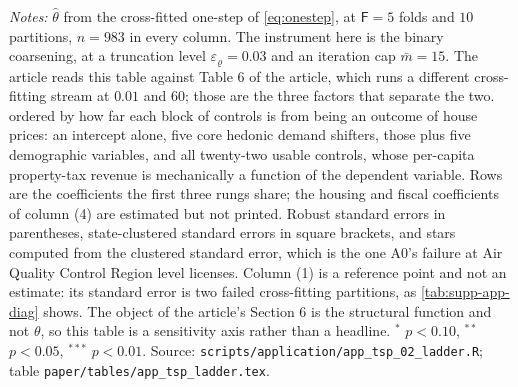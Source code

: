 \documentclass[
  12pt]{article}
\newcommand{\1}[1]{\mathds{1}\left[#1\right]}
\theoremstyle{plain}
\theoremstyle{definition}
\theoremstyle{definition}
\theoremstyle{remark}
\begin{document}
\addtocounter{table}{-1}
\endgroup
\begingroup\singlespacing\footnotesize
\noindent\textit{Notes:} $\hat\theta$ from the cross-fitted one-step of
\eqref{eq:onestep}, at $\mathsf F=5$ folds and $10$ partitions, $n=983$ in every
column. The instrument here is the binary coarsening, at a truncation level
$\varepsilon_\varrho=0.03$ and an iteration cap $\bar m=15$. The article reads
this table against Table 6 of the article, which runs a different cross-fitting
stream at $0.01$ and $60$; those are the three factors that separate the two.
ordered by how far each block
of controls is from being an outcome of house prices: an intercept alone, five
core hedonic demand shifters, those plus five demographic variables, and all
twenty-two usable controls, whose per-capita property-tax revenue is
mechanically a function of the dependent variable. Rows are the coefficients the
first three rungs share; the housing and fiscal coefficients of column (4) are
estimated but not printed. Robust standard errors in parentheses,
state-clustered standard errors in square brackets, and stars computed from the
clustered standard error, which is the one A0's failure at Air Quality Control
Region level licenses. Column (1) is a reference point and not an estimate: its
standard error is two failed cross-fitting partitions, as
\cref{tab:supp-app-diag} shows. The object of the article's Section 6 is the
structural function and not $\theta$, so this table is a sensitivity axis
rather than a headline. $^{*}$ $p<0.10$, $^{**}$ $p<0.05$, $^{***}$ $p<0.01$.
Source: \texttt{scripts/application/app\_tsp\_02\_ladder.R}; table
\texttt{paper/tables/app\_tsp\_ladder.tex}.
\par\endgroup
\end{document}
